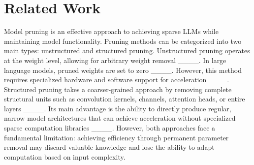 \section{Related Work}
Model pruning is an effective approach to achieving sparse LLMs while maintaining model functionality. Pruning methods can be categorized into two main types: unstructured and structured pruning. Unstructured pruning operates at the weight level, allowing for arbitrary weight removal ____. In large language models, pruned weights are set to zero ____. However, this method requires specialized hardware and software support for acceleration____. Structured pruning takes a coarser-grained approach by removing complete structural units such as convolution kernels, channels, attention heads, or entire layers ____. Its main advantage is the ability to directly produce regular, narrow model architectures that can achieve acceleration without specialized sparse computation libraries ____. However, both approaches face a fundamental limitation: achieving efficiency through permanent parameter removal may discard valuable knowledge and lose the ability to adapt computation based on input complexity.


